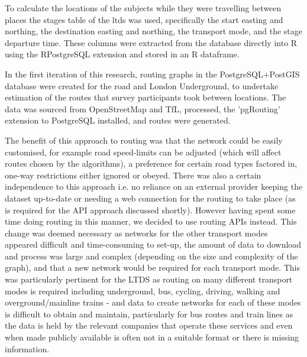 To calculate the locations of the subjects while they were travelling between places the stages table of the \gls{ltds} was used, specifically the start easting and northing, the destination easting and northing, the transport mode, and the stage departure time. These columns were extracted from the database directly into R using the RPostgreSQL extension and stored in an R dataframe. 

In the first iteration of this research, routing graphs in the PostgreSQL+PostGIS database were created for the road and London Underground, to undertake estimation of the routes that survey participants took between locations. The data was sourced from OpenStreetMap and TfL, processed, the 'pgRouting' extension to PostgreSQL installed, and routes were generated.

The benefit of this approach to routing was that the network could be easily customised, for example road speed-limits can be adjusted (which will affect routes chosen by the algorithms), a preference for certain road types factored in, one-way restrictions either ignored or obeyed. There was also a certain independence to this approach i.e. no reliance on an external provider keeping the dataset up-to-date or needing a web connection for the routing to take place (as is required for the API approach discussed shortly). However having spent some time doing routing in this manner, we decided to use routing APIs instead. This change was deemed necessary as networks for the other transport modes appeared difficult and time-consuming to set-up, the amount of data to download and process was large and complex (depending on the size and complexity of the graph), and that a new network would be required for each transport mode. This was particularly pertinent for the LTDS as routing on many different transport modes is required including underground, bus, cycling, driving, walking and overground/mainline trains - and data to create networks for each of these modes is difficult to obtain and maintain, particularly for bus routes and train lines as the data is held by the relevant companies that operate these services and even when made publicly available is often not in a suitable format or there is missing information.

